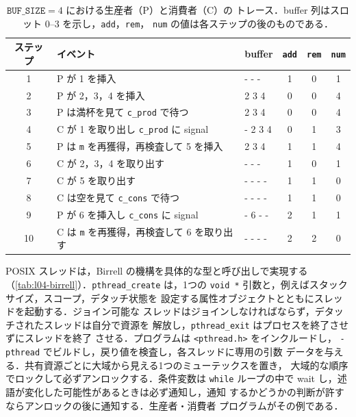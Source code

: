\documentclass[../main.tex]{subfiles}
\begin{document}
\begin{table}[htbp]
  \centering
  \caption{$\texttt{BUF\_SIZE}=4$ における生産者（P）と消費者（C）の
    トレース．buffer 列はスロット 0--3 を示し，\texttt{add}，\texttt{rem}，
    \texttt{num} の値は各ステップの後のものである．}
  \label{tab:l04-prodcons-trace}
  \small
  \setlength{\tabcolsep}{4pt}
  \begin{tabular}{@{}cl>{\ttfamily}lccc@{}}
    \toprule
    ステップ & イベント & \normalfont buffer & \texttt{add} & \texttt{rem} & \texttt{num} \\
    \midrule
     1 & P が 1 を挿入                        & 1 - - -  & 1 & 0 & 1 \\
     2 & P が 2，3，4 を挿入                  & 1 2 3 4  & 0 & 0 & 4 \\
     3 & P は満杯を見て \texttt{c\_prod} で待つ & 1 2 3 4 & 0 & 0 & 4 \\
     4 & C が 1 を取り出し \texttt{c\_prod} に signal & - 2 3 4 & 0 & 1 & 3 \\
     5 & P は \texttt{m} を再獲得，再検査して 5 を挿入 & 5 2 3 4 & 1 & 1 & 4 \\
     6 & C が 2，3，4 を取り出す              & 5 - - -  & 1 & 0 & 1 \\
     7 & C が 5 を取り出す                    & - - - -  & 1 & 1 & 0 \\
     8 & C は空を見て \texttt{c\_cons} で待つ  & - - - - & 1 & 1 & 0 \\
     9 & P が 6 を挿入し \texttt{c\_cons} に signal & - 6 - - & 2 & 1 & 1 \\
    10 & C は \texttt{m} を再獲得，再検査して 6 を取り出す & - - - - & 2 & 2 & 0 \\
    \bottomrule
  \end{tabular}
\end{table}

\begin{keypoint}[章のまとめ]
  POSIX スレッドは，Birrell の機構を具体的な型と呼び出しで実現する
  （\cref{tab:l04-birrell}）．\texttt{pthread\_create} は，1つの
  \texttt{void~*} 引数と，例えばスタックサイズ，スコープ，デタッチ状態を
  設定する属性オブジェクトとともにスレッドを起動する．ジョイン可能な
  スレッドはジョインしなければならず，デタッチされたスレッドは自分で資源を
  解放し，\texttt{pthread\_exit} はプロセスを終了させずにスレッドを終了
  させる．プログラムは \texttt{<pthread.h>} をインクルードし，
  \texttt{-pthread} でビルドし，戻り値を検査し，各スレッドに専用の引数
  データを与える．共有資源ごとに大域から見える1つのミューテックスを置き，
  大域的な順序でロックして必ずアンロックする．条件変数は \texttt{while}
  ループの中で wait し，述語が変化した可能性があるときは必ず通知し，通知
  するかどうかの判断が許すならアンロックの後に通知する．生産者・消費者
  プログラムがその例である．
\end{keypoint}
\end{document}
